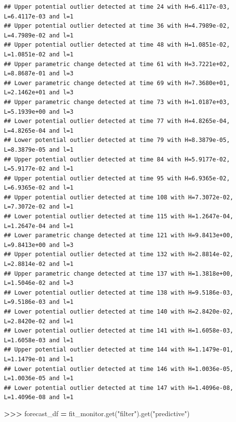 \documentclass[
]{article}
\newenvironment{Shaded}{\begin{snugshade}}{\end{snugshade}}
\newcommand{\NormalTok}[1]{#1}
\newcommand{\OperatorTok}[1]{\textcolor[rgb]{0.81,0.36,0.00}{\textbf{#1}}}
\newcommand{\StringTok}[1]{\textcolor[rgb]{0.31,0.60,0.02}{#1}}
\begin{document}
\begin{verbatim}
## Upper potential outlier detected at time 24 with H=6.4117e-03, L=6.4117e-03 and l=1
## Upper potential outlier detected at time 36 with H=4.7989e-02, L=4.7989e-02 and l=1
## Upper potential outlier detected at time 48 with H=1.0851e-02, L=1.0851e-02 and l=1
## Upper parametric change detected at time 61 with H=3.7221e+02, L=8.8687e-01 and l=3
## Lower parametric change detected at time 69 with H=7.3680e+01, L=2.1462e+01 and l=3
## Upper parametric change detected at time 73 with H=1.0187e+03, L=5.1939e+00 and l=3
## Lower potential outlier detected at time 77 with H=4.8265e-04, L=4.8265e-04 and l=1
## Lower potential outlier detected at time 79 with H=8.3879e-05, L=8.3879e-05 and l=1
## Upper potential outlier detected at time 84 with H=5.9177e-02, L=5.9177e-02 and l=1
## Upper potential outlier detected at time 95 with H=6.9365e-02, L=6.9365e-02 and l=1
## Upper potential outlier detected at time 108 with H=7.3072e-02, L=7.3072e-02 and l=1
## Lower potential outlier detected at time 115 with H=1.2647e-04, L=1.2647e-04 and l=1
## Lower parametric change detected at time 121 with H=9.8413e+00, L=9.8413e+00 and l=3
## Upper potential outlier detected at time 132 with H=2.8814e-02, L=2.8814e-02 and l=1
## Upper parametric change detected at time 137 with H=1.3818e+00, L=1.5046e-02 and l=3
## Lower potential outlier detected at time 138 with H=9.5186e-03, L=9.5186e-03 and l=1
## Lower potential outlier detected at time 140 with H=2.8420e-02, L=2.8420e-02 and l=1
## Lower potential outlier detected at time 141 with H=1.6058e-03, L=1.6058e-03 and l=1
## Upper potential outlier detected at time 144 with H=1.1479e-01, L=1.1479e-01 and l=1
## Lower potential outlier detected at time 146 with H=1.0036e-05, L=1.0036e-05 and l=1
## Lower potential outlier detected at time 147 with H=1.4096e-08, L=1.4096e-08 and l=1
\end{verbatim}

\begin{Shaded}
\begin{Highlighting}[]
\OperatorTok{\textgreater{}\textgreater{}\textgreater{}}\NormalTok{ forecast\_df }\OperatorTok{=}\NormalTok{ fit\_monitor.get(}\StringTok{"filter"}\NormalTok{).get(}\StringTok{"predictive"}\NormalTok{)}
\end{Highlighting}
\end{Shaded}
\end{document}
